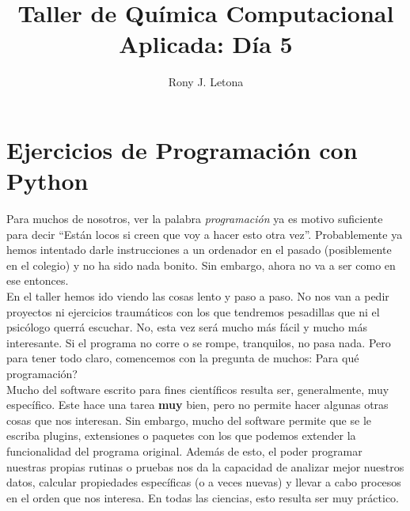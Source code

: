 \documentclass[10pt,letterpaper]{article}
\author{Rony J. Letona}
\title{Taller de Qu\'imica Computacional Aplicada: D\'ia 5}
\begin{document}
\maketitle

\section{Ejercicios de Programaci\'on con Python}
Para muchos de nosotros, ver la palabra \emph{programaci\'on} ya es motivo suficiente para decir ``Est\'an locos si creen que voy a hacer esto otra vez''. Probablemente ya hemos intentado darle instrucciones a un ordenador en el pasado (posiblemente en el colegio) y no ha sido nada bonito. Sin embargo, ahora no va a ser como en ese entonces.\\

En el taller hemos ido viendo las cosas lento y paso a paso. No nos van a pedir proyectos ni ejercicios traum\'aticos con los que tendremos pesadillas que ni el psic\'ologo querr\'a escuchar. No, esta vez ser\'a mucho m\'as f\'acil y mucho m\'as interesante. Si el programa no corre o se rompe, tranquilos, no pasa nada. Pero para tener todo claro, comencemos con la pregunta de muchos: Para qu\'e programaci\'on?\\

Mucho del software escrito para fines cient\'ificos resulta ser, generalmente, muy espec\'ifico. Este hace una tarea \textbf{muy} bien, pero no permite hacer algunas otras cosas que nos interesan. Sin embargo, mucho del software permite que se le escriba plugins, extensiones o paquetes con los que podemos extender la funcionalidad del programa original. Adem\'as de esto, el poder programar nuestras propias rutinas o pruebas nos da la capacidad de analizar mejor nuestros datos, calcular propiedades espec\'ificas (o a veces nuevas) y llevar a cabo procesos en el orden que nos interesa. En todas las ciencias, esto resulta ser muy pr\'actico.\\
\end{document}
